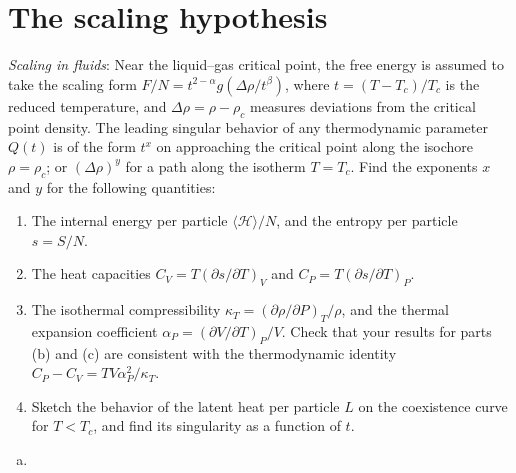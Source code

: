 \chapter{The scaling hypothesis}

\begin{problem}
    \textit{Scaling in fluids}: Near the liquid--gas critical point, the free energy is assumed to take the scaling form $F/N = t^{2-\alpha}g(\Delta\rho/t^\beta)$, where $t = (T - T_c)/T_c$ is the reduced temperature, and $\Delta\rho = \rho - \rho_c$ measures deviations from the critical point density. The leading singular behavior of any thermodynamic parameter $Q(t)$ is of the form $t^x$ on approaching the critical point along the isochore $\rho = \rho_c$; or $(\Delta\rho)^y$ for a path along the isotherm $T = T_c$. Find the exponents $x$ and $y$ for the following quantities:

    \begin{enumerate}
        \item[(a)] The internal energy per particle $\langle\mathcal{H}\rangle/N$, and the entropy per particle $s = S/N$.

        \item[(b)] The heat capacities $C_V = T(\partial s/\partial T)_V$ and $C_P = T(\partial s/\partial T)_P$.

        \item[(c)] The isothermal compressibility $\kappa_T = (\partial\rho/\partial P)_T/\rho$, and the thermal expansion coefficient $\alpha_P = (\partial V/\partial T)_P/V$. Check that your results for parts (b) and (c) are consistent with the thermodynamic identity $C_P - C_V = TV\alpha_P^2/\kappa_T$.

        \item[(d)] Sketch the behavior of the latent heat per particle $L$ on the coexistence curve for $T < T_c$, and find its singularity as a function of $t$.
    \end{enumerate}
\end{problem}

\begin{solution}
    \begin{enumerate}[(a)]
        \item
    \end{enumerate}
\end{solution}

